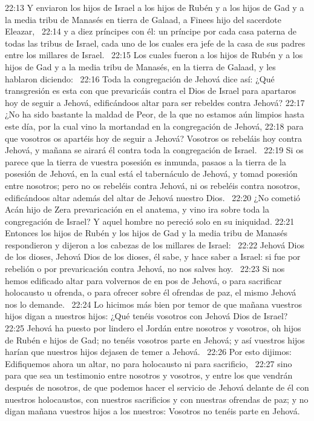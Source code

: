 22:13 Y enviaron los hijos de Israel a los hijos de Rubén y a los hijos de Gad y a la media tribu de Manasés en tierra de Galaad, a Finees hijo del sacerdote Eleazar,  
22:14 y a diez príncipes con él: un príncipe por cada casa paterna de todas las tribus de Israel, cada uno de los cuales era jefe de la casa de sus padres entre los millares de Israel.  
22:15 Los cuales fueron a los hijos de Rubén y a los hijos de Gad y a la media tribu de Manasés, en la tierra de Galaad, y les hablaron diciendo:  
22:16 Toda la congregación de Jehová dice así: ¿Qué transgresión es esta con que prevaricáis contra el Dios de Israel para apartaros hoy de seguir a Jehová, edificándoos altar para ser rebeldes contra Jehová? 
22:17 ¿No ha sido bastante la maldad de Peor, de la que no estamos aún limpios hasta este día, por la cual vino la mortandad en la congregación de Jehová, 
22:18 para que vosotros os apartéis hoy de seguir a Jehová? Vosotros os rebeláis hoy contra Jehová, y mañana se airará él contra toda la congregación de Israel.  
22:19 Si os parece que la tierra de vuestra posesión es inmunda, pasaos a la tierra de la posesión de Jehová, en la cual está el tabernáculo de Jehová, y tomad posesión entre nosotros; pero no os rebeléis contra Jehová, ni os rebeléis contra nosotros, edificándoos altar además del altar de Jehová nuestro Dios.  
22:20 ¿No cometió Acán hijo de Zera prevaricación en el anatema, y vino ira sobre toda la congregación de Israel? Y aquel hombre no pereció solo en su iniquidad. 
22:21 Entonces los hijos de Rubén y los hijos de Gad y la media tribu de Manasés respondieron y dijeron a los cabezas de los millares de Israel:  
22:22 Jehová Dios de los dioses, Jehová Dios de los dioses, él sabe, y hace saber a Israel: si fue por rebelión o por prevaricación contra Jehová, no nos salves hoy.  
22:23 Si nos hemos edificado altar para volvernos de en pos de Jehová, o para sacrificar holocausto u ofrenda, o para ofrecer sobre él ofrendas de paz, el mismo Jehová nos lo demande.  
22:24 Lo hicimos más bien por temor de que mañana vuestros hijos digan a nuestros hijos: ¿Qué tenéis vosotros con Jehová Dios de Israel?  
22:25 Jehová ha puesto por lindero el Jordán entre nosotros y vosotros, oh hijos de Rubén e hijos de Gad; no tenéis vosotros parte en Jehová; y así vuestros hijos harían que nuestros hijos dejasen de temer a Jehová.  
22:26 Por esto dijimos: Edifiquemos ahora un altar, no para holocausto ni para sacrificio,  
22:27 sino para que sea un testimonio entre nosotros y vosotros, y entre los que vendrán después de nosotros, de que podemos hacer el servicio de Jehová delante de él con nuestros holocaustos, con nuestros sacrificios y con nuestras ofrendas de paz; y no digan mañana vuestros hijos a los nuestros: Vosotros no tenéis parte en Jehová.  

